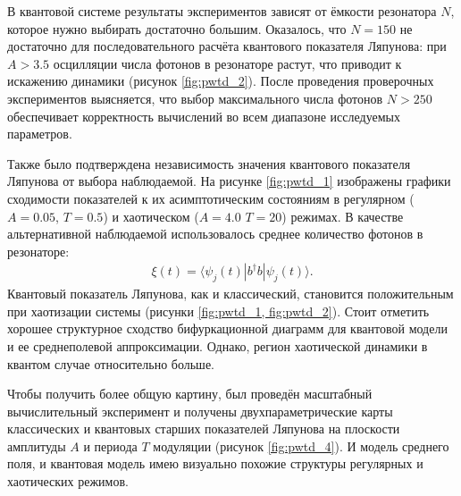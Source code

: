 В квантовой системе результаты экспериментов зависят от ёмкости резонатора $N$, которое нужно выбирать достаточно большим.
Оказалось, что $N = 150$ не достаточно для последовательного расчёта квантового показателя Ляпунова: при $A>3.5$ осцилляции числа фотонов в резонаторе растут, что приводит к искажению динамики (рисунок \cref{fig:pwtd_2}). 
После проведения проверочных экспериментов выясняется, что выбор максимального числа фотонов $N>250$ обеспечивает корректность вычислений во всем диапазоне исследуемых параметров.

Также было подтверждена независимость значения квантового показателя Ляпунова от выбора наблюдаемой.
На рисунке \cref{fig:pwtd_1} изображены графики сходимости показателей к их асимптотическим состояниям в регулярном ($A = 0.05$, $T = 0.5$) и хаотическом ($A = 4.0$ $T = 20$) режимах. В качестве альтернативной наблюдаемой использовалось среднее количество фотонов в резонаторе:
\begin{equation}
	\label{eq:pwtd_num_ph}
	\begin{gathered}
		\xi(t) = \langle \psi_j(t)| b^{\dagger} b | \psi_j(t) \rangle.
	\end{gathered}
\end{equation}
Квантовый показатель Ляпунова, как и классический, становится положительным при хаотизации системы (рисунки \cref{fig:pwtd_1, fig:pwtd_2}). 
Стоит отметить хорошее структурное сходство бифуркационной диаграмм для квантовой модели и ее среднеполевой аппроксимации. Однако, регион хаотической динамики в квантом случае относительно больше.

Чтобы получить более общую картину, был проведён масштабный вычислительный эксперимент и получены двухпараметрические карты  классических и квантовых старших показателей Ляпунова на плоскости амплитуды $A$ и периода $T$ модуляции (рисунок \cref{fig:pwtd_4}). 
И модель среднего поля, и квантовая модель имею визуально похожие структуры регулярных и хаотических режимов.





